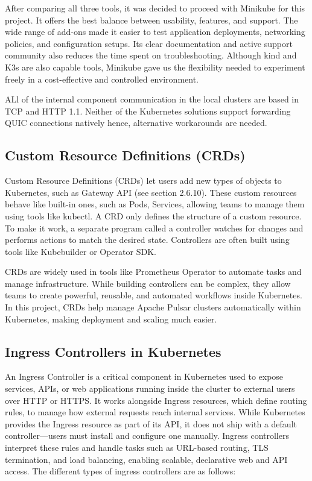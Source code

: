 After comparing all three tools, it was decided to proceed with Minikube for this project. It offers the best balance between usability, features, and support. The wide range of add-ons made it easier to test application deployments, networking policies, and configuration setups. Its clear documentation and active support community also reduces the time spent on troubleshooting. Although kind and K3s are also capable tools, Minikube gave us the flexibility needed to experiment freely in a cost-effective and controlled environment.

ALl of the internal component communication in the local clusters are based in TCP and HTTP 1.1. Neither of the Kubernetes solutions support forwarding QUIC connections natively hence, alternative workarounds are needed.

\subsection{Custom Resource Definitions (CRDs)}
Custom Resource Definitions (CRDs) let users add new types of objects to Kubernetes, such as Gateway API (see section 2.6.10). These custom resources behave like built-in ones, such as Pods, Services, allowing teams to manage them using tools like kubectl. A CRD only defines the structure of a custom resource. To make it work, a separate program called a controller watches for changes and performs actions to match the desired state. Controllers are often built using tools like Kubebuilder or Operator SDK.

CRDs are widely used in tools like Prometheus Operator to automate tasks and manage infrastructure. While building controllers can be complex, they allow teams to create powerful, reusable, and automated workflows inside Kubernetes. In this project, CRDs help manage Apache Pulsar clusters automatically within Kubernetes, making deployment and scaling much easier.

\subsection{Ingress Controllers in Kubernetes}
An Ingress Controller is a critical component in Kubernetes used to expose services, APIs, or web applications running inside the cluster to external users over HTTP or HTTPS. It works alongside Ingress resources, which define routing rules, to manage how external requests reach internal services. While Kubernetes provides the Ingress resource as part of its API, it does not ship with a default controller—users must install and configure one manually. Ingress controllers interpret these rules and handle tasks such as URL-based routing, TLS termination, and load balancing, enabling scalable, declarative web and API access. The different types of ingress controllers are as follows:



